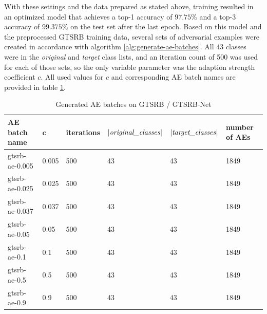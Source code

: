 \documentclass[11pt, a4paper]{article}
\newcommand{\abs}[1]{\left\lvert#1\right\rvert}
\begin{document}
With these settings and the data prepared as stated above, training resulted in an optimized model that achieves a top-1 accuracy of $97.75\%$ and a top-3 accuracy of $99.375\%$ on the test set after the last epoch. Based on this model and the preprocessed GTSRB training data, several sets of adversarial examples were created in accordance with algorithm \ref{alg:generate-ae-batches}. All $43$ classes were in the \emph{original} and \emph{target} class lists, and an iteration count of 500 was used for each of those sets, so the only variable parameter was the adaption strength coefficient $c$. All used values for $c$ and corresponding AE batch names are provided in table \ref{tab:gtsrb-ae-batches}.

\begin{table}[h!tb]
	\centering
	\begin{tabular}{|l|l|l|l|l|l|}
		\hline
		AE batch name & c & iterations & $\abs{\text{\emph{original\_classes}}}$ & $\abs{\text{\emph{target\_classes}}}$ & number of AEs \\
		\hline
		gtsrb-ae-0.005 & 0.005 & 500 & 43 & 43 & 1849 \\
		gtsrb-ae-0.025 & 0.025 & 500 & 43 & 43 & 1849 \\
		gtsrb-ae-0.037 & 0.037 & 500 & 43 & 43 & 1849 \\
		gtsrb-ae-0.05 & 0.05 & 500 & 43 & 43 & 1849 \\
		gtsrb-ae-0.1 & 0.1 & 500 & 43 & 43 & 1849 \\
		gtsrb-ae-0.5 & 0.5 & 500 & 43 & 43 & 1849 \\
		gtsrb-ae-0.9 & 0.9 & 500 & 43 & 43 & 1849 \\
		\hline
	\end{tabular}
	\caption{Generated AE batches on GTSRB / GTSRB-Net}
	\label{tab:gtsrb-ae-batches}
\end{table}
\end{document}
